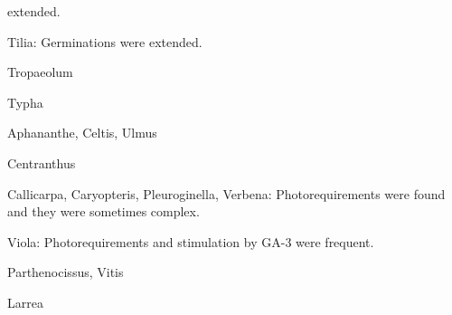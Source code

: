 \begin{description}
extended.
\item[Tiliaceae] Tilia: Germinations were extended.
\item[Tropaeolaceae] Tropaeolum
\item[Typhaceae] Typha
\item[Ulmaceae] Aphananthe, Celtis, Ulmus
\item[Valerianaceae] Centranthus
\item[Verbenaceae] Callicarpa, Caryopteris, Pleuroginella, Verbena:
Photorequirements were found and they were sometimes complex.
\item[Violaceae] Viola: Photorequirements and stimulation by GA-3 were
frequent.
\item[Vitaceae] Parthenocissus, Vitis
\item[Zygophyllaceae] Larrea
\end{description}

